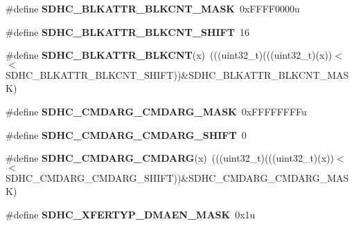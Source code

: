 \begin{DoxyCompactItemize}
\item 
\#define {\bfseries S\+D\+H\+C\+\_\+\+B\+L\+K\+A\+T\+T\+R\+\_\+\+B\+L\+K\+C\+N\+T\+\_\+\+M\+A\+SK}~0x\+F\+F\+F\+F0000u\hypertarget{group__SDHC__Register__Masks_ga797a081db083b97f61d5f657ae83f752}{}\label{group__SDHC__Register__Masks_ga797a081db083b97f61d5f657ae83f752}

\item 
\#define {\bfseries S\+D\+H\+C\+\_\+\+B\+L\+K\+A\+T\+T\+R\+\_\+\+B\+L\+K\+C\+N\+T\+\_\+\+S\+H\+I\+FT}~16\hypertarget{group__SDHC__Register__Masks_ga1461e7582635ec25e017243f95a9e649}{}\label{group__SDHC__Register__Masks_ga1461e7582635ec25e017243f95a9e649}

\item 
\#define {\bfseries S\+D\+H\+C\+\_\+\+B\+L\+K\+A\+T\+T\+R\+\_\+\+B\+L\+K\+C\+NT}(x)~(((uint32\+\_\+t)(((uint32\+\_\+t)(x))$<$$<$S\+D\+H\+C\+\_\+\+B\+L\+K\+A\+T\+T\+R\+\_\+\+B\+L\+K\+C\+N\+T\+\_\+\+S\+H\+I\+FT))\&S\+D\+H\+C\+\_\+\+B\+L\+K\+A\+T\+T\+R\+\_\+\+B\+L\+K\+C\+N\+T\+\_\+\+M\+A\+SK)\hypertarget{group__SDHC__Register__Masks_ga02677301c96c876e9db0d959ce6d5585}{}\label{group__SDHC__Register__Masks_ga02677301c96c876e9db0d959ce6d5585}

\item 
\#define {\bfseries S\+D\+H\+C\+\_\+\+C\+M\+D\+A\+R\+G\+\_\+\+C\+M\+D\+A\+R\+G\+\_\+\+M\+A\+SK}~0x\+F\+F\+F\+F\+F\+F\+F\+Fu\hypertarget{group__SDHC__Register__Masks_ga96ab88ba50cc09465c266e3aab2ba3b0}{}\label{group__SDHC__Register__Masks_ga96ab88ba50cc09465c266e3aab2ba3b0}

\item 
\#define {\bfseries S\+D\+H\+C\+\_\+\+C\+M\+D\+A\+R\+G\+\_\+\+C\+M\+D\+A\+R\+G\+\_\+\+S\+H\+I\+FT}~0\hypertarget{group__SDHC__Register__Masks_gaa96f4afe969ac51d89ac52df46867f0a}{}\label{group__SDHC__Register__Masks_gaa96f4afe969ac51d89ac52df46867f0a}

\item 
\#define {\bfseries S\+D\+H\+C\+\_\+\+C\+M\+D\+A\+R\+G\+\_\+\+C\+M\+D\+A\+RG}(x)~(((uint32\+\_\+t)(((uint32\+\_\+t)(x))$<$$<$S\+D\+H\+C\+\_\+\+C\+M\+D\+A\+R\+G\+\_\+\+C\+M\+D\+A\+R\+G\+\_\+\+S\+H\+I\+FT))\&S\+D\+H\+C\+\_\+\+C\+M\+D\+A\+R\+G\+\_\+\+C\+M\+D\+A\+R\+G\+\_\+\+M\+A\+SK)\hypertarget{group__SDHC__Register__Masks_ga396ddd22ee6d52bc20fe7838e2832cff}{}\label{group__SDHC__Register__Masks_ga396ddd22ee6d52bc20fe7838e2832cff}

\item 
\#define {\bfseries S\+D\+H\+C\+\_\+\+X\+F\+E\+R\+T\+Y\+P\+\_\+\+D\+M\+A\+E\+N\+\_\+\+M\+A\+SK}~0x1u\hypertarget{group__SDHC__Register__Masks_ga4d3f71daacb879dbeb42972d25faa220}{}\label{group__SDHC__Register__Masks_ga4d3f71daacb879dbeb42972d25faa220}


\end{DoxyCompactItemize}
